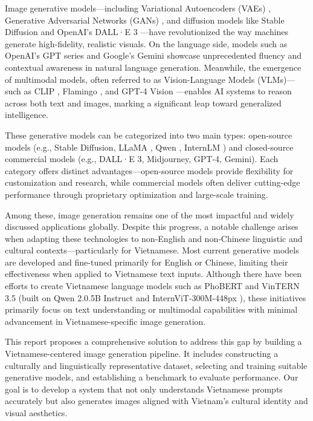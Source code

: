\documentclass[conference]{IEEEtran}
\begin{document}
Image generative models—including Variational Autoencoders (VAEs) \cite{vae}, Generative Adversarial Networks (GANs) \cite{gans}, and diffusion models like Stable Diffusion \cite{stablediffusion} and OpenAI's DALL·E 3 \cite{openai2023dalle3}—have revolutionized the way machines generate high-fidelity, realistic visuals. On the language side, models such as OpenAI's GPT series \cite{openai2023gpt4} and Google's Gemini \cite{google2023gemini} showcase unprecedented fluency and contextual awareness in natural language generation. Meanwhile, the emergence of multimodal models, often referred to as Vision-Language Models (VLMs)—such as CLIP \cite{clip}, Flamingo \cite{alayrac2022flamingo}, and GPT-4 Vision \cite{openai2023gpt4}—enables AI systems to reason across both text and images, marking a significant leap toward generalized intelligence.

These generative models can be categorized into two main types: open-source models (e.g., Stable Diffusion, LLaMA \cite{touvron2023llama}, Qwen \cite{yang2024qwen2}, InternLM \cite{chen2024internvl}) and closed-source commercial models (e.g., DALL·E 3, Midjourney, GPT-4, Gemini). Each category offers distinct advantages—open-source models provide flexibility for customization and research, while commercial models often deliver cutting-edge performance through proprietary optimization and large-scale training.

Among these, image generation remains one of the most impactful and widely discussed applications globally. Despite this progress, a notable challenge arises when adapting these technologies to non-English and non-Chinese linguistic and cultural contexts—particularly for Vietnamese. Most current generative models are developed and fine-tuned primarily for English or Chinese, limiting their effectiveness when applied to Vietnamese text inputs. Although there have been efforts to create Vietnamese language models such as PhoBERT \cite{nguyen2020phobertpretrainedlanguagemodels} and VinTERN 3.5 \cite{doan2024vintern1befficientmultimodallarge} (built on Qwen 2.0.5B Instruct \cite{yang2024qwen2} and InternViT-300M-448px \cite{chen2024internvl}), these initiatives primarily focus on text understanding or multimodal capabilities with minimal advancement in Vietnamese-specific image generation.

This report proposes a comprehensive solution to address this gap by building a Vietnamese-centered image generation pipeline. It includes constructing a culturally and linguistically representative dataset, selecting and training suitable generative models, and establishing a benchmark to evaluate performance. Our goal is to develop a system that not only understands Vietnamese prompts accurately but also generates images aligned with Vietnam's cultural identity and visual aesthetics.
\end{document}
